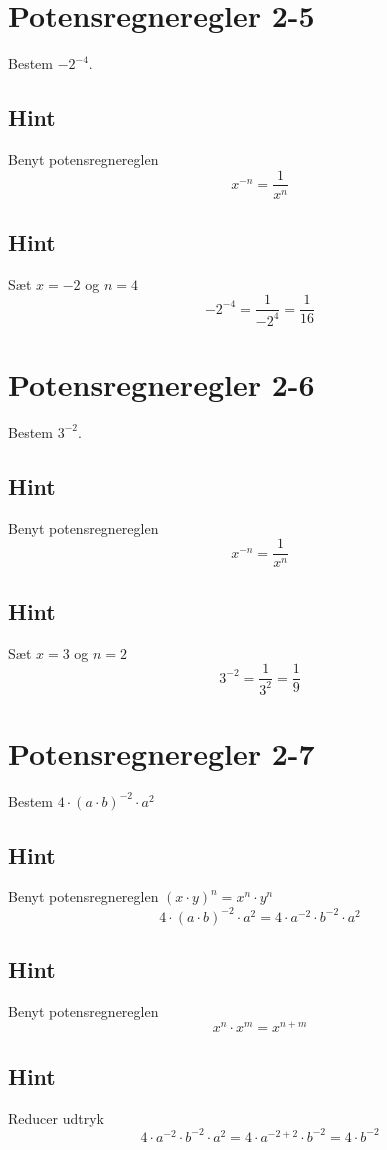\documentclass{article}
\newenvironment{exercise}[1]{\newpage\section{#1}}{}
\newcommand{\answerbox}[1]{\fbox{$#1$}}
\newcommand{\hint}{\subsection*{Hint}}
\begin{document}
\newpage

\begin{exercise}{Potensregneregler 2-5}
	
	Bestem $-2^{-4}$.
	
	\answerbox{\frac{1}{16}}
	
	\hint
	Benyt potensregnereglen 
	\[
	x^{-n} = \frac{1}{x^{n}} 
	\]
	
	\hint 
	
	Sæt $x=-2$ og $n=4$ 
	\[
	-2^{-4} = \frac{1}{-2^4} = \frac{1}{16}
	\]
	
\end{exercise}

\newpage

\begin{exercise}{Potensregneregler 2-6}
	
	Bestem $3^{-2}$.
	
	\answerbox{\frac{1}{9}}
	
	\hint
	Benyt potensregnereglen 
	\[
	x^{-n} = \frac{1}{x^{n}} 
	\]
	
	\hint 
	
	Sæt $x=3$ og $n=2$ 
	\[
	3^{-2} = \frac{1}{3^2} = \frac{1}{9}
	\]
	
\end{exercise}

\newpage

\begin{exercise}{Potensregneregler 2-7}
	
	Bestem $4 \cdot (a \cdot b)^{-2} \cdot a^2$
		
	\answerbox{4 \cdot b^{-2}}
	
	\hint
	
	Benyt potensregnereglen $(x \cdot y)^n = x^n \cdot y^n$
	\[
	4 \cdot (a \cdot b)^{-2} \cdot a^2 = 4 \cdot a^{-2} \cdot b^{-2} \cdot a^{2}
	\]
	
	\hint
	Benyt potensregnereglen 
	\[
	x^n \cdot x^m  = x^{n+m} 
	\]
	
	\hint 
	
	Reducer udtryk
	\[
	4 \cdot a^{-2} \cdot b^{-2} \cdot a^{2} = 4 \cdot a^{-2+2} \cdot b^{-2} = 4 \cdot b^{-2}
	\]
	
\end{exercise}

\newpage
\end{document}
